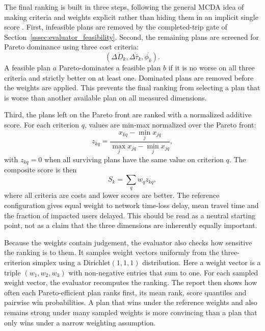 The final ranking is built in three steps, following the general MCDA idea of
making criteria and weights explicit rather than hiding them in an implicit
single score \cite{mcda_manual}. First, infeasible plans are removed
by the completed-trip gate of Section~\ref{sssec:evaluator_feasibility}.
Second, the remaining plans are screened for Pareto dominance using three cost
criteria:
\begin{equation}
  \left(
    \overline{\Delta D_k},
    \overline{\Delta \bar{\tau}_k},
    \overline{\phi_k}
  \right).
  \label{eq:evaluator_criteria_vector}
\end{equation}
A feasible plan $a$ Pareto-dominates a feasible plan $b$ if it is no worse on
all three criteria and strictly better on at least one. Dominated plans are
removed before the weights are applied. This prevents the final ranking from
selecting a plan that is worse than another available plan on all measured
dimensions.

Third, the plans left on the Pareto front are ranked with a normalized
additive score. For each criterion $q$, values are min-max normalized over the
Pareto front:
\begin{equation}
  z_{kq}
  =
  \frac{x_{kq} - \min_j x_{jq}}
       {\max_j x_{jq} - \min_j x_{jq}},
  \label{eq:evaluator_normalisation}
\end{equation}
with $z_{kq}=0$ when all surviving plans have the same value on criterion
$q$. The composite score is then
\begin{equation}
  S_k = \sum_q w_q z_{kq},
  \label{eq:evaluator_additive_score}
\end{equation}
where all criteria are costs and lower scores are better. The reference
configuration gives equal weight to network time-loss delay, mean travel time and the
fraction of impacted users delayed. This should be read as a neutral starting
point, not as a claim that the three dimensions are inherently equally
important.

Because the weights contain judgement, the evaluator also checks how sensitive
the ranking is to them. It samples weight vectors uniformly from the
three-criterion simplex using a Dirichlet$(1,1,1)$ distribution. Here a
weight vector is a triple $(w_1,w_2,w_3)$ with non-negative entries that sum
to one. For each sampled weight vector, the evaluator
recomputes the ranking. The report then shows how often each
Pareto-efficient plan ranks first, its mean rank, score quantiles and
pairwise win probabilities. A plan that wins under the reference weights and
also remains strong under many sampled weights is more convincing than a plan
that only wins under a narrow weighting assumption.
